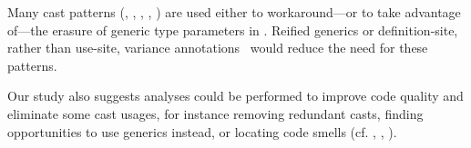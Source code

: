 Many cast patterns (\eg, 
,
,
,
)
are used either to 
workaround---or to take advantage of---the erasure of generic type parameters in \java{}.
Reified generics or definition-site, rather than use-site, variance annotations~\cite{altidorTamingWildcardsCombining2011}
would reduce the need for these patterns.

Our study also suggests analyses could be performed to improve code quality and eliminate some cast usages,
for instance removing redundant casts,
finding opportunities to use generics instead,
or locating code smells (cf.
,
,
).